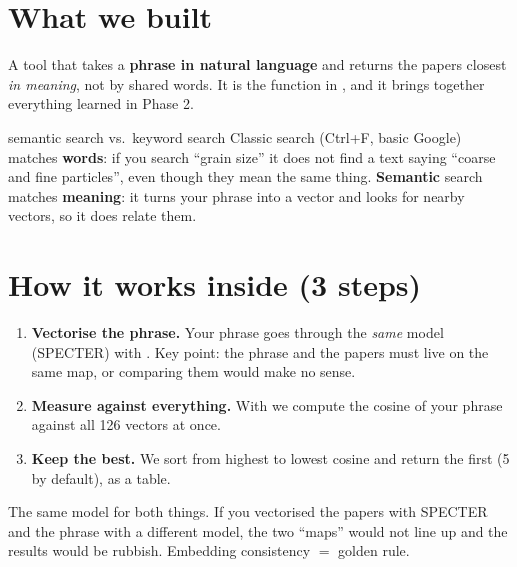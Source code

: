 \documentclass[11pt,a4paper]{article}
\begin{document}

\section{What we built}

A tool that takes a \textbf{phrase in natural language} and returns the papers closest
\emph{in meaning}, not by shared words. It is the  function in
, and it brings together everything learned in Phase 2.

\begin{concepto}{semantic search vs.\ keyword search}
Classic search (Ctrl+F, basic Google) matches \textbf{words}: if you search ``grain size'' it
does not find a text saying ``coarse and fine particles'', even though they mean the same
thing. \textbf{Semantic} search matches \textbf{meaning}: it turns your phrase into a vector
and looks for nearby vectors, so it does relate them.
\end{concepto}

\section{How it works inside (3 steps)}

\begin{enumerate}
  \item \textbf{Vectorise the phrase.} Your phrase goes through the \emph{same} model
        (SPECTER) with . Key point: the phrase and the papers
        must live on the same map, or comparing them would make no sense.
  \item \textbf{Measure against everything.} With  we compute the
        cosine of your phrase against all 126 vectors at once.
  \item \textbf{Keep the best.} We sort from highest to lowest cosine and return the first
         (5 by default), as a  table.
\end{enumerate}

\begin{ojo}
The same model for both things. If you vectorised the papers with SPECTER and the phrase with
a different model, the two ``maps'' would not line up and the results would be rubbish.
Embedding consistency $=$ golden rule.
\end{ojo}
\end{document}
